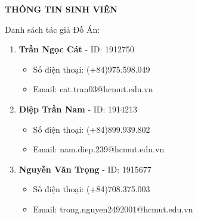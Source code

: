 \newpage
\begin{center}
    \bf{THÔNG TIN SINH VIÊN}
\end{center}
Danh sách tác giả Đồ Án:
\begin{enumerate}
    \item \textbf{Trần Ngọc Cát} - ID: 1912750
    \begin{itemize}
        \item Số điện thoại: (+84)975.598.049
        \item Email: cat.tran03@hcmut.edu.vn
    \end{itemize}
    \item \textbf{Diệp Trần Nam} - ID: 1914213
    \begin{itemize}
        \item Số điện thoại: (+84)899.939.802
        \item Email: nam.diep.239@hcmut.edu.vn
    \end{itemize}
    \item \textbf{Nguyễn Văn Trọng} - ID: 1915677
    \begin{itemize}
        \item Số điện thoại: (+84)708.375.003  
        \item Email: trong.nguyen2492001@hcmut.edu.vn
    \end{itemize}
\end{enumerate}
